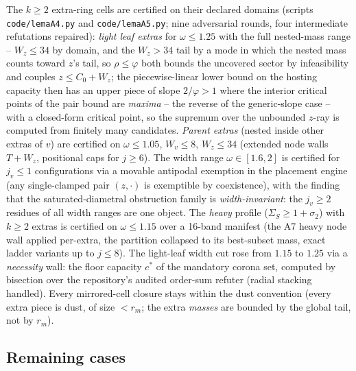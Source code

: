 \documentclass[11pt]{article}
\theoremstyle{definition}
\begin{document}
The $k\ge2$ extra-ring cells are certified on their declared
domains (scripts \texttt{code/lemaA4.py} and
\texttt{code/lemaA5.py}; nine adversarial rounds, four
intermediate refutations repaired): \emph{light leaf extras} for
$\omega\le1.25$ with the full nested-mass range -- $W_z\le34$ by
domain, and the $W_z>34$ tail by a mode in which the nested mass
counts toward $z$'s tail, so $\rho\le\varphi$ both bounds the
uncovered sector by infeasibility and couples $z\le C_0+W_z$; the
piecewise-linear lower bound on the hosting capacity then has an
upper piece of slope $2/\varphi>1$ where the interior critical
points of the pair bound are \emph{maxima} -- the reverse of the
generic-slope case -- with a closed-form critical point, so the
supremum over the unbounded $z$-ray is computed from finitely many
candidates. \emph{Parent extras} (nested inside other extras of
$v$) are certified on $\omega\le1.05$, $W_v\le8$, $W_z\le34$
(extended node walls $T+W_z$, positional caps for $j\ge6$). The
width range $\omega\in[1.6,2]$ is certified for $j_v\le1$
configurations via a movable antipodal exemption in the placement
engine (any single-clamped pair $(z,\cdot)$ is exemptible by
coexistence), with the finding that the saturated-diametral
obstruction family is \emph{width-invariant}: the $j_v\ge2$
residues of all width ranges are one object. The \emph{heavy}
profile ($\Sigma_S\ge1+\sigma_2$) with $k\ge2$ extras is
certified on $\omega\le1.15$ over a 16-band manifest (the A7
heavy node wall applied per-extra, the partition collapsed to its
best-subset mass, exact ladder variants up to $j\le8$). The
light-leaf width cut rose from $1.15$ to $1.25$ via a
\emph{necessity} wall: the floor capacity $c^*$ of the mandatory
corona set, computed by bisection over the repository's audited
order-sum refuter (radial stacking handled). Every mirrored-cell
closure stays within the dust convention (every extra piece is
dust, of size $<r_m$; the extra \emph{masses} are bounded by the
global tail, not by $r_m$).

\subsection*{Remaining cases}
\end{document}
